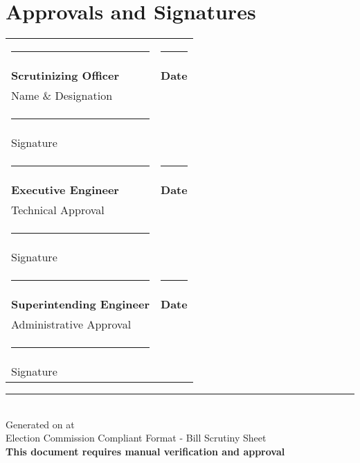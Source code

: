 \documentclass[12pt,a4paper]{article}
\begin{document}
\vspace{2cm}
\section*{Approvals and Signatures}

\begin{center}
\begin{tabular}{p{6cm}p{6cm}}
\rule{5cm}{0.5pt} & \rule{5cm}{0.5pt} \\
\textbf{Scrutinizing Officer} & \textbf{Date} \\
Name \& Designation & \\
\rule{5cm}{0.5pt} & \\
Signature & \\[1.5cm]

\rule{5cm}{0.5pt} & \rule{5cm}{0.5pt} \\
\textbf{Executive Engineer} & \textbf{Date} \\
Technical Approval & \\
\rule{5cm}{0.5pt} & \\
Signature & \\[1.5cm]

\rule{5cm}{0.5pt} & \rule{5cm}{0.5pt} \\
\textbf{Superintending Engineer} & \textbf{Date} \\
Administrative Approval & \\
\rule{5cm}{0.5pt} & \\
Signature & \\
\end{tabular}
\end{center}

\vspace{2cm}
\begin{center}
\end{center}

\vspace{1cm}
\begin{center}
\rule{\textwidth}{1pt}\\
\small
Generated on  at \\
Election Commission Compliant Format - Bill Scrutiny Sheet\\
\textbf{This document requires manual verification and approval}
\end{center}
\end{document}
